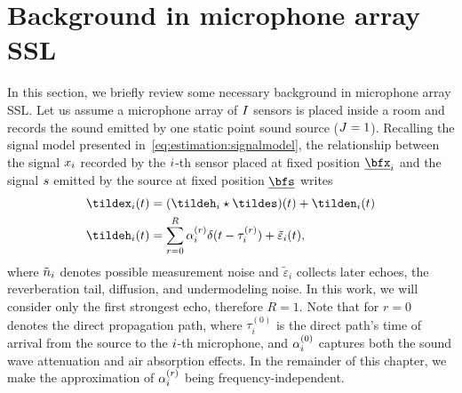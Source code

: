 \section{Background in microphone array SSL}\label{sec:background}
In this section, we briefly review some necessary background in microphone array \ac{SSL}.
Let us assume a microphone array of $I$ sensors is placed inside a room and records the sound emitted by one static point sound source ($J=1$).
Recalling the signal model presented in~\cref{eq:estimation:signalmodel}, the relationship between the signal $x_{i}$ recorded by the $i$-th sensor placed at fixed position $\positionMicrophone_\idxMic$ and the signal $s$ emitted by the source at fixed position $\positionSource$ writes
\begin{equation}\label{eq:mirage:signalmodel}
    \begin{aligned}
        \tildex_i(t) &= (\tildeh_i \convCont \tildes)(t) + \tilden_i(t)\\
        \tildeh_i(t) &= \echoModelTimeSimple{i} + \tilde{\varepsilon}_i(t),
    \end{aligned}
\end{equation}
where $\tilde{n}_{i}$ denotes possible measurement noise and $\tilde{\varepsilon}_i$ collects later echoes, the reverberation tail, diffusion, and undermodeling noise.
In this work, we will consider only the first strongest echo, therefore $R = 1$.
Note that for $r=0$ denotes the direct propagation path, where $\tau_i^{(0)}$ is the direct path's time of arrival from the source to the $i$-th microphone, and $\alpha^{(0)}_{i}$ captures both the sound wave attenuation and air absorption effects.
In the remainder of this chapter, we make the approximation of $\alpha_i^{(r)}$ being frequency-independent.

